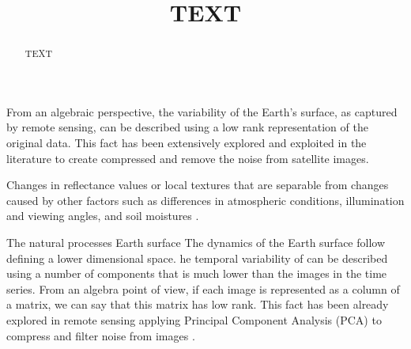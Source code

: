 \documentclass[essd, manuscript]{copernicus}
\begin{document}
\title{TEXT}



\Author[]{}{}
\Author[]{}{}
\Author[]{}{}








\received{}
\pubdiscuss{} %
\revised{}
\accepted{}
\published{}



\maketitle

\begin{abstract}
TEXT
\end{abstract}


\introduction  %

From an algebraic perspective, the variability of the Earth's surface, as captured by remote sensing, can be described using a low rank representation of the original data. This fact has been extensively explored and exploited in the literature to create compressed and remove the noise from satellite images. 

Changes in reflectance values or local textures that are separable from changes caused by other factors such as differences in atmospheric conditions, illumination and viewing angles, and soil moistures \citep{deng2008pca}.

The natural processes Earth surface 
The dynamics of the Earth surface follow defining a lower dimensional space.  he temporal variability of can be described using a number of components that is much lower than the images in the time series. From an algebra point of view, if each image is represented as a column of a matrix, we can say that this matrix has low rank. This fact has been already explored in remote sensing applying Principal Component Analysis (PCA) to compress and filter noise from images \citep{}.
\end{document}
